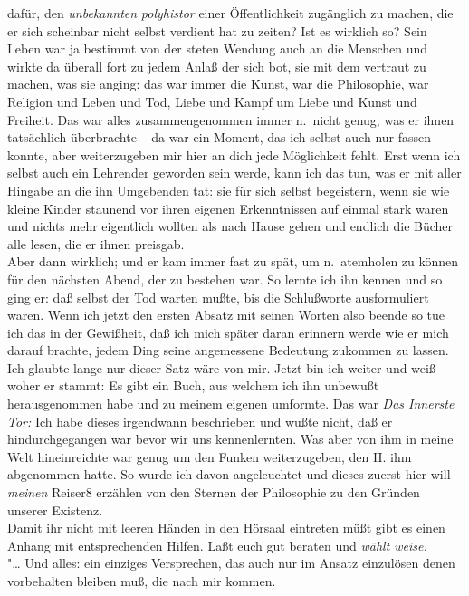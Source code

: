 \documentclass[
]{article}
\begin{document}
dafür, den \emph{unbekannten} \emph{polyhistor} einer Öffentlichkeit
zugänglich zu machen, die er sich scheinbar nicht selbst verdient hat zu
zeiten? Ist es wirklich so? Sein Leben war ja bestimmt von der steten
Wendung auch an die Menschen und wirkte da überall fort zu jedem Anlaß
der sich bot, sie mit dem vertraut zu machen, was sie anging: das war
immer die Kunst, war die Philosophie, war Religion und Leben und Tod,
Liebe und Kampf um Liebe und Kunst und Freiheit. Das war alles
zusammengenommen immer n.~nicht genug, was er ihnen tatsächlich
überbrachte -- da war ein Moment, das ich selbst auch nur fassen konnte,
aber weiterzugeben mir hier an dich jede Möglichkeit fehlt. Erst wenn
ich selbst auch ein Lehrender geworden sein werde, kann ich das tun, was
er mit aller Hingabe an die ihn Umgebenden tat: sie für sich selbst
begeistern, wenn sie wie kleine Kinder staunend vor ihren eigenen
Erkenntnissen auf einmal stark waren und nichts mehr eigentlich wollten
als nach Hause gehen und endlich die Bücher alle lesen, die er ihnen
preisgab.\\
Aber dann wirklich; und er kam immer fast zu spät, um n.~atemholen zu
können für den nächsten Abend, der zu bestehen war. So lernte ich ihn
kennen und so ging er: daß selbst der Tod warten mußte, bis die
Schlußworte ausformuliert waren. Wenn ich jetzt den ersten Absatz mit
seinen Worten also beende so tue ich das in der Gewißheit, daß ich mich
später daran erinnern werde wie er mich darauf brachte, jedem Ding seine
angemessene Bedeutung zukommen zu lassen. Ich glaubte lange nur dieser
Satz wäre von mir. Jetzt bin ich weiter und weiß woher er stammt: Es
gibt ein Buch, aus welchem ich ihn unbewußt herausgenommen habe und zu
meinem eigenen umformte. Das war \emph{Das Innerste Tor:} Ich habe
dieses irgendwann beschrieben und wußte nicht, daß er hindurchgegangen
war bevor wir uns kennenlernten. Was aber von ihm in meine Welt
hineinreichte war genug um den Funken weiterzugeben, den H. ihm
abgenommen hatte. So wurde ich davon angeleuchtet und dieses zuerst hier
will \emph{meinen} Reiser8 erzählen von den Sternen der Philosophie zu
den Gründen unserer Existenz.\\
Damit ihr nicht mit leeren Händen in den Hörsaal eintreten müßt gibt es
einen Anhang mit entsprechenden Hilfen. Laßt euch gut beraten und
\emph{wählt weise.}\\
"\ldots{} Und alles: ein einziges Versprechen, das auch nur im Ansatz
einzulösen denen vorbehalten bleiben muß, die nach mir kommen.
\end{document}
